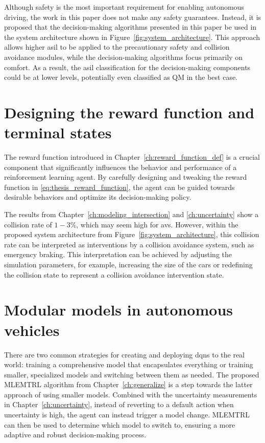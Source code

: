 Although safety is the most important requirement for enabling autonomous driving, the work in this paper does not make any safety guarantees. Instead, it is proposed that the decision-making algorithms presented in this paper be used in the system architecture shown in Figure~\ref{fig:system_architecture}. This approach allows higher \gls{asil} to be applied to the precautionary safety and collision avoidance modules, while the decision-making algorithms focus primarily on comfort. As a result, the \gls{asil} classification for the decision-making components could be at lower levels, potentially even classified as QM in the best case.

\section{Designing the reward function and terminal states}
The reward function introduced in Chapter~\ref{ch:reward_function_def} is a crucial component that significantly influences the behavior and performance of a reinforcement learning agent. By carefully designing and tweaking the reward function in \eqref{eq:thesis_reward_function}, the agent can be guided towards desirable behaviors and optimize its decision-making policy. 

The results from Chapter~\ref*{ch:modeling_intersection} and \ref{ch:uncertainty} show a collision rate of $1-3\%$, which may seem high for \glspl{av}. However, within the proposed system architecture from Figure~\ref{fig:system_architecture}, this collision rate can be interpreted as interventions by a collision avoidance system, such as emergency braking. This interpretation can be achieved by adjusting the simulation parameters, for example, increasing the size of the cars or redefining the collision state to represent a collision avoidance intervention state.



\section{Modular models in autonomous vehicles}
There are two common strategies for creating and deploying \glspl{dqn} to the real world: training a comprehensive model that encapsulates everything or training smaller, specialized models and switching between them as needed. The proposed MLEMTRL algorithm from Chapter~\ref{ch:generalize} is a step towards the latter approach of using smaller models. Combined with the uncertainty measurements in Chapter~\ref{ch:uncertainty}, instead of reverting to a default action when uncertainty is high, the agent can instead trigger a model change. MLEMTRL can then be used to determine which model to switch to, ensuring a more adaptive and robust decision-making process.

